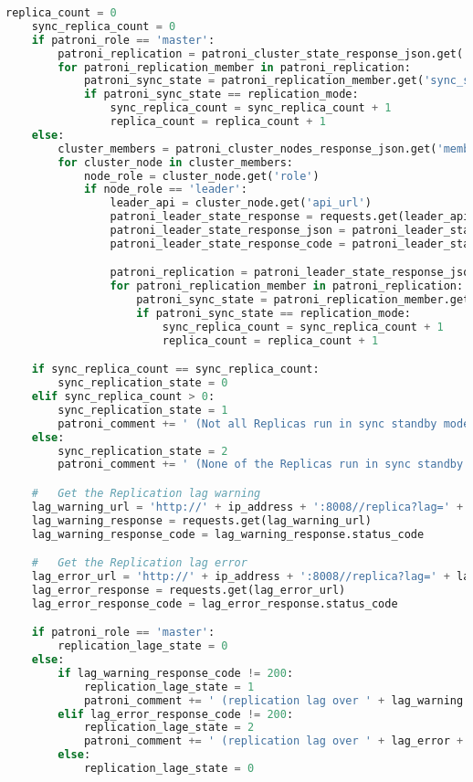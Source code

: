 \begin{flushleft}
\begin{lstlisting}[language=python, caption=Monitoring - KSGR - Patroni - Healthcheck.py,captionpos=b,label={lst:monitoring-python},breaklines=true]
    replica_count = 0
    sync_replica_count = 0
    if patroni_role == 'master':
        patroni_replication = patroni_cluster_state_response_json.get('replication')
        for patroni_replication_member in patroni_replication:
            patroni_sync_state = patroni_replication_member.get('sync_state')
            if patroni_sync_state == replication_mode:
                sync_replica_count = sync_replica_count + 1
                replica_count = replica_count + 1
    else:
        cluster_members = patroni_cluster_nodes_response_json.get('members')
        for cluster_node in cluster_members:
            node_role = cluster_node.get('role')
            if node_role == 'leader':
                leader_api = cluster_node.get('api_url')
                patroni_leader_state_response = requests.get(leader_api)
                patroni_leader_state_response_json = patroni_leader_state_response.json()
                patroni_leader_state_response_code = patroni_leader_state_response.status_code

                patroni_replication = patroni_leader_state_response_json.get('replication')
                for patroni_replication_member in patroni_replication:
                    patroni_sync_state = patroni_replication_member.get('sync_state')
                    if patroni_sync_state == replication_mode:
                        sync_replica_count = sync_replica_count + 1
                        replica_count = replica_count + 1

    if sync_replica_count == sync_replica_count:
        sync_replication_state = 0
    elif sync_replica_count > 0:
        sync_replication_state = 1
        patroni_comment += ' (Not all Replicas run in sync standby mode)'
    else:
        sync_replication_state = 2
        patroni_comment += ' (None of the Replicas run in sync standby mode)'

    #   Get the Replication lag warning
    lag_warning_url = 'http://' + ip_address + ':8008//replica?lag=' + lag_warning
    lag_warning_response = requests.get(lag_warning_url)
    lag_warning_response_code = lag_warning_response.status_code

    #   Get the Replication lag error
    lag_error_url = 'http://' + ip_address + ':8008//replica?lag=' + lag_error
    lag_error_response = requests.get(lag_error_url)
    lag_error_response_code = lag_error_response.status_code

    if patroni_role == 'master':
        replication_lage_state = 0
    else:
        if lag_warning_response_code != 200:
            replication_lage_state = 1
            patroni_comment += ' (replication lag over ' + lag_warning + ')'
        elif lag_error_response_code != 200:
            replication_lage_state = 2
            patroni_comment += ' (replication lag over ' + lag_error + ')'
        else:
            replication_lage_state = 0


\end{lstlisting}
\end{flushleft}
